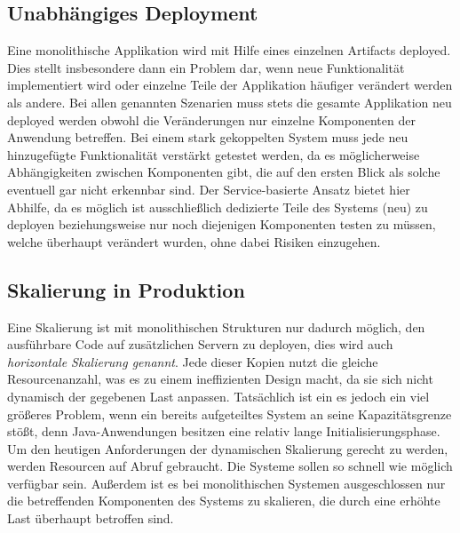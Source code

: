 \subsection{Unabhängiges Deployment \checkmark \checkmark}
Eine monolithische Applikation wird mit Hilfe eines einzelnen Artifacts deployed. Dies stellt insbesondere dann ein Problem dar, wenn neue Funktionalität implementiert wird oder einzelne Teile der Applikation häufiger verändert werden als andere. Bei allen genannten Szenarien muss stets die gesamte Applikation neu deployed werden obwohl die Veränderungen nur einzelne Komponenten der Anwendung betreffen. Bei einem stark gekoppelten System muss jede neu hinzugefügte Funktionalität verstärkt getestet werden, da es möglicherweise Abhängigkeiten zwischen Komponenten gibt, die auf den ersten Blick als solche eventuell gar nicht erkennbar sind. Der Service-basierte Ansatz bietet hier Abhilfe, da es möglich ist ausschließlich dedizierte Teile des Systems (neu) zu deployen beziehungsweise nur noch diejenigen Komponenten testen zu müssen, welche überhaupt verändert wurden, ohne dabei Risiken einzugehen. 


\subsection{Skalierung in Produktion \checkmark \checkmark}
Eine Skalierung ist mit monolithischen Strukturen nur dadurch möglich, den ausführbare Code auf zusätzlichen Servern zu deployen, dies wird auch \emph{horizontale Skalierung genannt}. Jede dieser Kopien nutzt die gleiche Resourcenanzahl, was es zu einem ineffizienten Design macht, da sie sich nicht dynamisch der gegebenen Last anpassen. Tatsächlich ist ein es jedoch ein viel größeres Problem, wenn ein bereits aufgeteiltes System an seine Kapazitätsgrenze stößt, denn Java-Anwendungen besitzen eine relativ lange Initialisierungsphase. Um den heutigen Anforderungen der dynamischen Skalierung gerecht zu werden, werden Resourcen auf Abruf gebraucht. Die Systeme sollen so schnell wie möglich verfügbar sein. Außerdem ist es bei monolithischen Systemen ausgeschlossen nur die betreffenden Komponenten des Systems zu skalieren, die durch eine erhöhte Last überhaupt betroffen sind.



